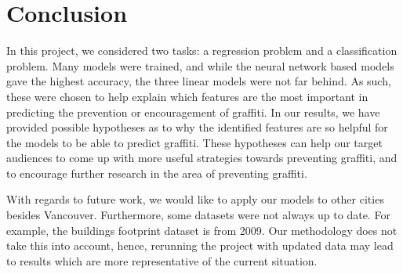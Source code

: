 \chapter{Conclusion}

In this project, we considered two tasks: a regression problem and a classification problem. Many models were trained, and while the neural network based models gave the highest accuracy, the three linear models were not far behind. As such, these were chosen to help explain which features are the most important in predicting the prevention or encouragement of graffiti. In our results, we have provided possible hypotheses as to why the identified features are so helpful for the models to be able to predict graffiti. These hypotheses can help our target audiences to come up with more useful strategies towards preventing graffiti, and to encourage further research in the area of preventing graffiti.

With regards to future work, we would like to apply our models to other cities besides Vancouver. Furthermore, some datasets were not always up to date. For example, the buildings footprint dataset is from 2009. Our methodology does not take this into account, hence, rerunning the project with updated data may lead to results which are more representative of the current situation.
